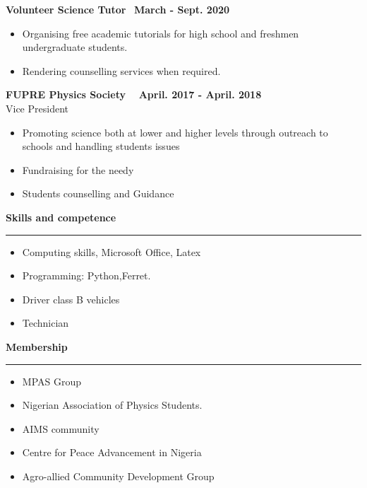 \documentclass[a4paper]{article}
\begin{document}
	
	\noindent \textbf{Volunteer Science Tutor}     \quad \qquad \ \qquad \qquad \qquad \qquad \qquad \qquad \qquad \qquad \qquad \qquad  \quad \quad  \textbf{March - Sept. 2020} 
	\\
	\begin{itemize}
		\item Organising free academic  tutorials for high school and freshmen undergraduate students.
		\item Rendering counselling services when required.
		
	\end{itemize}
	\vspace{2.5mm}
	\noindent \textbf{FUPRE Physics Society}    \qquad  \qquad \qquad \qquad \qquad \qquad \qquad \qquad \qquad \qquad \quad \qquad \ \  \textbf{April. 2017 - April. 2018} 
	\\
	Vice President
	\begin{itemize}
	\item Promoting science both at lower and higher levels through outreach to schools and handling students issues
	\item Fundraising for the needy
	\item Students counselling and Guidance
	
	\end{itemize}
\newpage
		
		
		


	\noindent \textbf{Skills and competence}
	\\
	\vspace{-2.8mm}
	\hrule 
	\vspace{-3.5mm}
	\begin{multicols}{2}
		\begin{itemize}
				
		
			
			\item Computing skills, Microsoft Office, Latex
			\item Programming: Python,Ferret.
			\item Driver class B vehicles
			\item Technician 
		\end{itemize}
	\end{multicols}
	\noindent \textbf{Membership}
	\\
	\vspace{-2.8mm}
	\hrule 
	\begin{multicols}{2}
		\begin{itemize}
			\item MPAS Group
			\item 	Nigerian Association of Physics Students.
			\item AIMS community
			\item Centre for Peace Advancement in Nigeria
			\item Agro-allied Community Development Group
		\end{itemize}
	\end{multicols}
	
\end{document}
